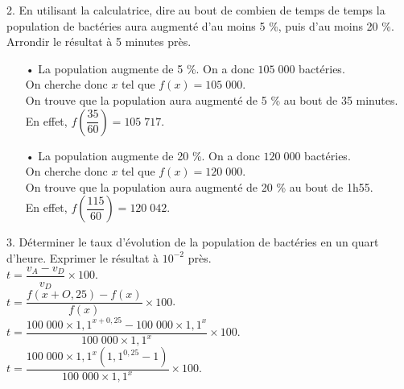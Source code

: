 2. En utilisant la calculatrice, dire au bout de combien de temps de temps la population de bactéries aura augmenté d'au moins 5 \%, puis d'au moins 20 \%. Arrondir le résultat à 5 minutes près. 

\vspace*{.3cm}

\begin{itemize}
\item[•] La population augmente de 5 \%. On a donc $105\; 000$ bactéries. \\
On cherche donc $x$ tel que $f(x) = 105\;000$. \\
On trouve que la population aura augmenté de 5 \% au bout de 35 minutes. \\
En effet, $f\left(\dfrac{35}{60}\right) = 105\; 717$. \\
\item[•] La population augmente de 20 \%. On a donc $120\; 000$ bactéries. \\
On cherche donc $x$ tel que $f(x) = 120\;000$. \\
On trouve que la population aura augmenté de 20 \% au bout de 1h55. \\
En effet, $f\left(\dfrac{115}{60}\right) = 120\;042$. \\
\end{itemize}

\vspace*{.3cm}

\newpage

3. Déterminer le taux d'évolution de la population de bactéries en un quart d'heure. Exprimer le résultat à $10^{-2}$ près. \\

$t = \dfrac{v_A - v_D}{v_D} \times 100$. \vspace*{.3cm} \\

$t = \dfrac{f\left(x + O,25\right) - f\left(x\right)}{f\left(x\right)} \times 100$. \vspace*{.3cm} \\

$t = \dfrac{100\;000 \times 1,1^{x + 0,25} - 100\;000 \times 1,1^{x}}{100\;000 \times 1,1^x} \times 100$. \vspace*{.3cm} \\

$t = \dfrac{100\;000 \times 1,1^x \left(1,1^{0,25} - 1\right)}{100\;000 \times 1,1^x} \times 100$. \vspace*{.3cm} \\

